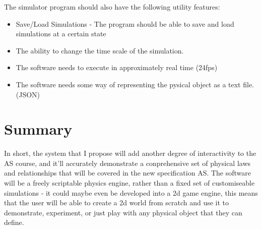 The simulator program should also have the following utility features:
\begin{itemize}
	\item Save/Load Simulations - The program should be able to save and load simulations at a certain state
	\item The ability to change the time scale of the simulation.
	\item The software needs to execute in approximately real time (24fps)
	\item The software needs some way of representing the pysical object as a text file. (JSON)

\end{itemize}


\section{Summary}
In short, the system that I propose will add another degree of interactivity to the AS course, and it'll accurately demonstrate a conprehensive set of physical laws and relationships that will be covered in the new specification AS. The software will be a freely scriptable physics engine, rather than a fixed set of customiseable simulations - it could maybe even be developed into a 2d game engine, this means that the user will be able to create a 2d world from scratch and use it to demonstrate, experiment, or just play with any physical object that they can define.